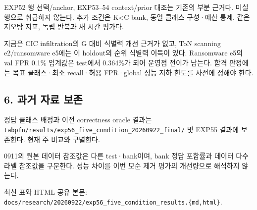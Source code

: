 EXP52 행 선택/\allowbreak{}anchor, EXP53–54 context/\allowbreak{}prior 대조는 기존의 부분 근거다. 미실행으로 취급하지 않는다. 추가 조건은 K<C bank, 동일 클래스 구성·예산 통제, 같은 저오탐 지표, 독립 반복과 새 시간 평가다.

지금은 CIC infiltration의 G 대비 식별력 개선 근거가 없고, ToN scanning e2/\allowbreak{}ransomware e5에는 이 holdout의 순위 식별력 이득이 있다. Ransomware e5의 val FPR 0.1\% 임계값은 test에서 0.364\%가 되어 운영점 전이가 남는다. 합격 판정에는 목표 클래스·최소 recall·허용 FPR·global 성능 저하 한도를 사전에 정해야 한다.

\subsection{6. 과거 자료 보존}
\par\noindent \textbullet\enspace 정답 클래스 배정과 이전 correctness oracle 결과는 \texttt{tabpfn/\allowbreak{}\allowbreak{}r\allowbreak{}esults/\allowbreak{}\allowbreak{}e\allowbreak{}xp56\_\allowbreak{}\allowbreak{}fiv\allowbreak{}e\_\allowbreak{}\allowbreak{}condit\allowbreak{}ion\_\allowbreak{}\allowbreak{}2026\allowbreak{}0922\_\allowbreak{}\allowbreak{}fin\allowbreak{}al/\allowbreak{}\allowbreak{}} 및 EXP55 결과에 보존한다. 현재 주 비교와 구별한다.


\par\noindent \textbullet\enspace 0911의 원본 데이터 참조값은 다른 test·bank이며, bank 정답 포함률과 데이터 다수 라벨 참조값을 구분한다. 성능 차이를 이번 모순 제거 평가의 개선량으로 해석하지 않는다.


\par\noindent \textbullet\enspace 최신 표와 HTML 공유 본문: \texttt{docs/\allowbreak{}\allowbreak{}res\allowbreak{}earch/\allowbreak{}\allowbreak{}20\allowbreak{}260922/\allowbreak{}\allowbreak{}e\allowbreak{}xp56\_\allowbreak{}\allowbreak{}fiv\allowbreak{}e\_\allowbreak{}\allowbreak{}condit\allowbreak{}ion\_\allowbreak{}\allowbreak{}resu\allowbreak{}lts.\allowbreak{}\{\allowbreak{}md,\allowbreak{}html\}\allowbreak{}}.




